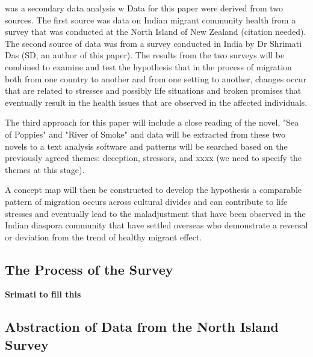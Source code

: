  was a secondary data analysis w
Data for this paper were derived from two sources. The first source was data on Indian migrant community health from a survey that was conducted at the North Island of New Zealand (citation needed). The second source of data was from a survey conducted in India by Dr Shrimati Das (SD, an author of this paper). The results from the two surveys will be combined to examine and test the hypothesis that in the process of migration both from one country to another and from one setting to another, changes occur that are related to stresses and possibly life situations and broken promises that eventually result in the health issues that are observed in the affected individuals.

The third approach for this paper will include a close reading of the novel, "Sea of Poppies" and "River of Smoke" and data will be extracted from these two novels to a text analysis software and patterns will be searched based on the previously agreed themes: deception, stressors, and xxxx (we need to specify the themes at this stage).

A concept map will then be constructed to develop the hypothesis a comparable pattern of migration occurs across cultural divides and can contribute to life stresses and eventually lead to the maladjustment that have been observed in the Indian diaspora community that have settled overseas who demonstrate a reversal or deviation from the trend of healthy migrant effect. 

\subsection{The Process of the Survey}
\textbf{Srimati to fill this}

\subsection{Abstraction of Data from the North Island Survey}


